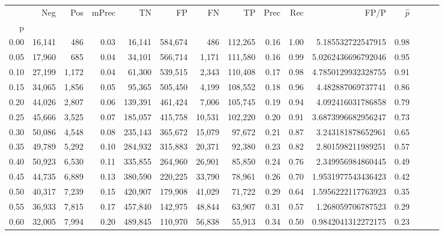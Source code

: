 \begin{tabular}{rrrrrrrrrrrrrrr}
\toprule
{} &     Neg &    Pos & mPrec &       TN &       FP &       FN &       TP &  Prec &   Rec &                 FP/P & $\hat{p}$ \\
p    &         &        &       &          &          &          &          &       &       &                      &           \\
\midrule
0.00 &  16,141 &    486 &  0.03 &   16,141 &  584,674 &      486 &  112,265 &  0.16 &  1.00 &    5.185532722547915 &      0.98 \\
0.05 &  17,960 &    685 &  0.04 &   34,101 &  566,714 &    1,171 &  111,580 &  0.16 &  0.99 &   5.0262436696792046 &      0.95 \\
0.10 &  27,199 &  1,172 &  0.04 &   61,300 &  539,515 &    2,343 &  110,408 &  0.17 &  0.98 &   4.7850129932328755 &      0.91 \\
0.15 &  34,065 &  1,856 &  0.05 &   95,365 &  505,450 &    4,199 &  108,552 &  0.18 &  0.96 &    4.482887069737741 &      0.86 \\
0.20 &  44,026 &  2,807 &  0.06 &  139,391 &  461,424 &    7,006 &  105,745 &  0.19 &  0.94 &    4.092416031786858 &      0.79 \\
0.25 &  45,666 &  3,525 &  0.07 &  185,057 &  415,758 &   10,531 &  102,220 &  0.20 &  0.91 &   3.6873996682956247 &      0.73 \\
0.30 &  50,086 &  4,548 &  0.08 &  235,143 &  365,672 &   15,079 &   97,672 &  0.21 &  0.87 &    3.243181878652961 &      0.65 \\
0.35 &  49,789 &  5,292 &  0.10 &  284,932 &  315,883 &   20,371 &   92,380 &  0.23 &  0.82 &    2.801598211989251 &      0.57 \\
0.40 &  50,923 &  6,530 &  0.11 &  335,855 &  264,960 &   26,901 &   85,850 &  0.24 &  0.76 &    2.349956984860445 &      0.49 \\
0.45 &  44,735 &  6,889 &  0.13 &  380,590 &  220,225 &   33,790 &   78,961 &  0.26 &  0.70 &   1.9531977543436423 &      0.42 \\
0.50 &  40,317 &  7,239 &  0.15 &  420,907 &  179,908 &   41,029 &   71,722 &  0.29 &  0.64 &   1.5956222117763923 &      0.35 \\
0.55 &  36,933 &  7,815 &  0.17 &  457,840 &  142,975 &   48,844 &   63,907 &  0.31 &  0.57 &    1.268059706787523 &      0.29 \\
0.60 &  32,005 &  7,994 &  0.20 &  489,845 &  110,970 &   56,838 &   55,913 &  0.34 &  0.50 &   0.9842041312272175 &      0.23 \\

\end{tabular}
